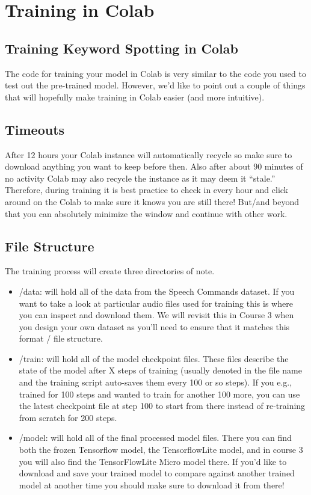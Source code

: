\section{Training in Colab}

\subsection{Training Keyword Spotting in Colab}

The code for training your model in Colab is very similar to the code you used to test out the pre-trained model. However, we’d like to point out a couple of things that will hopefully make training in Colab easier (and more intuitive).

\subsection{Timeouts}

After 12 hours your Colab instance will automatically recycle so make sure to download anything you want to keep before then. Also after about 90 minutes of no activity Colab may also recycle the instance as it may deem it “stale.” Therefore, during training it is best practice to check in every hour and click around on the Colab to make sure it knows you are still there! But/and beyond that you can absolutely minimize the window and continue with other work.

\subsection{File Structure}

The training process will create three directories of note.

\begin{itemize}
  \item /data: will hold all of the data from the Speech Commands dataset. If you want to take a look at particular audio files used for training this is where you can inspect and download them. We will revisit this in Course 3 when you design your own dataset as you’ll need to ensure that it matches this format / file structure.

  \item /train: will hold all of the model checkpoint files. These files describe the state of the model after X steps of training (usually denoted in the file name and the training script auto-saves them every 100 or so steps). If you e.g., trained for 100 steps and wanted to train for another 100 more, you can use the latest checkpoint file at step 100 to start from there instead of re-training from scratch for 200 steps.

  \item /model: will hold all of the final processed model files. There you can find both the frozen Tensorflow model, the TensorflowLite model, and in course 3 you will also find the TensorFlowLite Micro model there. If you’d like to download and save your trained model to compare against another trained model at another time you should make sure to download it from there!
\end{itemize}


